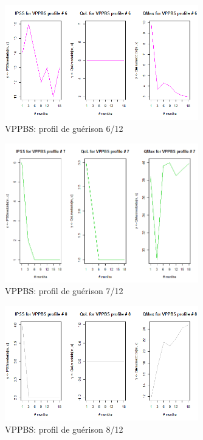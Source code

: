 \begin{figure}[H]
\centering
\includegraphics[width=0.75\textwidth]{../Fig/VPPBS/vppbs-profil-post-06.png}
\caption{VPPBS: profil de guérison 6/12}
\end{figure}

\begin{figure}[H]
\centering
\includegraphics[width=0.75\textwidth]{../Fig/VPPBS/vppbs-profil-post-07.png}
\caption{VPPBS: profil de guérison 7/12}
\end{figure}

\begin{figure}[H]
\centering
\includegraphics[width=0.75\textwidth]{../Fig/VPPBS/vppbs-profil-post-08.png}
\caption{VPPBS: profil de guérison 8/12}
\end{figure}

